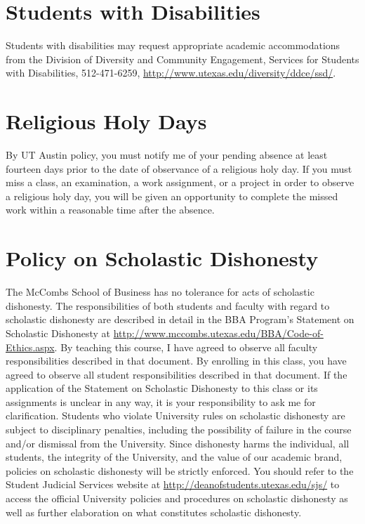 \documentclass[12pt]{article}
\begin{document}
\section*{Students with Disabilities}

Students with disabilities may request appropriate academic accommodations from the Division of Diversity and Community Engagement, Services for Students with Disabilities, 512-471-6259, \url{http://www.utexas.edu/diversity/ddce/ssd/}.

\section*{Religious Holy Days}

By UT Austin policy, you must notify me of your pending absence at least fourteen days prior to the date of observance of a religious holy day.  If you must miss a class, an examination, a work assignment, or a project in order to observe a religious holy day, you will be given an opportunity to complete the missed work within a reasonable time after the absence.

\section*{Policy on Scholastic Dishonesty}

The McCombs School of Business has no tolerance for acts of scholastic dishonesty. The responsibilities of both students and faculty with regard to scholastic dishonesty are described in detail in the BBA Program's Statement on Scholastic Dishonesty at \url{http://www.mccombs.utexas.edu/BBA/Code-of-Ethics.aspx}.  By teaching this course, I have agreed to observe all faculty responsibilities described in that document. By enrolling in this class, you have agreed to observe all student responsibilities described in that document. If the application of the Statement on Scholastic Dishonesty to this class or its assignments is unclear in any way, it is your responsibility to ask me for clarification. Students who violate University rules on scholastic dishonesty are subject to disciplinary penalties, including the possibility of failure in the course and/or dismissal from the University. Since dishonesty harms the individual, all students, the integrity of the University, and the value of our academic brand, policies on scholastic dishonesty will be strictly enforced. You should refer to the Student Judicial Services website at \url{http://deanofstudents.utexas.edu/sjs/} to access the official University policies and procedures on scholastic dishonesty as well as further elaboration on what constitutes scholastic dishonesty.
\end{document}
